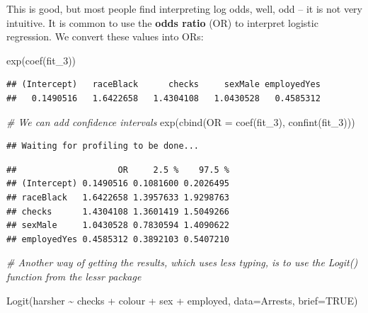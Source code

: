 \documentclass[
]{book}
\newenvironment{Shaded}{\begin{snugshade}}{\end{snugshade}}
\newcommand{\AttributeTok}[1]{\textcolor[rgb]{0.77,0.63,0.00}{#1}}
\newcommand{\CommentTok}[1]{\textcolor[rgb]{0.56,0.35,0.01}{\textit{#1}}}
\newcommand{\ConstantTok}[1]{\textcolor[rgb]{0.00,0.00,0.00}{#1}}
\newcommand{\FunctionTok}[1]{\textcolor[rgb]{0.00,0.00,0.00}{#1}}
\newcommand{\NormalTok}[1]{#1}
\newcommand{\SpecialCharTok}[1]{\textcolor[rgb]{0.00,0.00,0.00}{#1}}
\begin{document}
This is good, but most people find interpreting log odds, well, odd -- it is not very intuitive. It is common to use the \textbf{odds ratio} (OR) to interpret logistic regression. We convert these values into ORs:

\begin{Shaded}
\begin{Highlighting}[]
\FunctionTok{exp}\NormalTok{(}\FunctionTok{coef}\NormalTok{(fit\_3))}
\end{Highlighting}
\end{Shaded}

\begin{verbatim}
## (Intercept)   raceBlack      checks     sexMale employedYes 
##   0.1490516   1.6422658   1.4304108   1.0430528   0.4585312
\end{verbatim}

\begin{Shaded}
\begin{Highlighting}[]
\CommentTok{\# We can add confidence intervals}
\FunctionTok{exp}\NormalTok{(}\FunctionTok{cbind}\NormalTok{(}\AttributeTok{OR =} \FunctionTok{coef}\NormalTok{(fit\_3), }\FunctionTok{confint}\NormalTok{(fit\_3)))}
\end{Highlighting}
\end{Shaded}

\begin{verbatim}
## Waiting for profiling to be done...
\end{verbatim}

\begin{verbatim}
##                    OR     2.5 %    97.5 %
## (Intercept) 0.1490516 0.1081600 0.2026495
## raceBlack   1.6422658 1.3957633 1.9298763
## checks      1.4304108 1.3601419 1.5049266
## sexMale     1.0430528 0.7830594 1.4090622
## employedYes 0.4585312 0.3892103 0.5407210
\end{verbatim}

\begin{Shaded}
\begin{Highlighting}[]
\CommentTok{\# Another way of getting the results, which uses less typing, is to use the Logit() function from the lessr package}

\FunctionTok{Logit}\NormalTok{(harsher }\SpecialCharTok{\textasciitilde{}}\NormalTok{ checks }\SpecialCharTok{+}\NormalTok{ colour }\SpecialCharTok{+}\NormalTok{ sex }\SpecialCharTok{+}\NormalTok{ employed, }\AttributeTok{data=}\NormalTok{Arrests, }\AttributeTok{brief=}\ConstantTok{TRUE}\NormalTok{)}
\end{Highlighting}
\end{Shaded}
\end{document}
